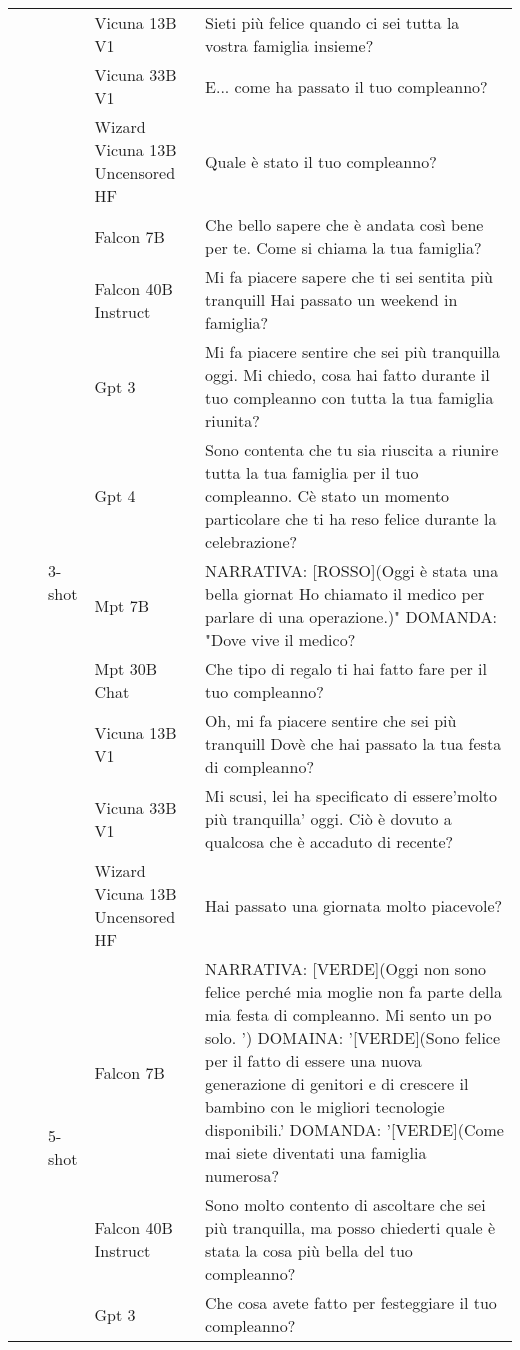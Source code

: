 \begin{center}
\begin{longtable}{l|l|l|p{3cm}|p{8cm}}
 &  &  & Vicuna 13B V1 & Sieti più felice quando ci sei tutta la vostra famiglia insieme? \\
 &  &  & Vicuna 33B V1 & E... come ha passato il tuo compleanno? \\
 &  &  & Wizard Vicuna 13B Uncensored HF &  Quale è stato il tuo compleanno? \\
\cline{3-5}
 &  & \multirow[c]{9}{*}{3-shot} & Falcon 7B & Che bello sapere che è andata così bene per te. Come si chiama la tua famiglia? \\
 &  &  & Falcon 40B Instruct & Mi fa piacere sapere che ti sei sentita più tranquill Hai passato un weekend in famiglia? \\
 &  &  & Gpt 3 & Mi fa piacere sentire che sei più tranquilla oggi. Mi chiedo, cosa hai fatto durante il tuo compleanno con tutta la tua famiglia riunita? \\
 &  &  & Gpt 4 & Sono contenta che tu sia riuscita a riunire tutta la tua famiglia per il tuo compleanno. Cè stato un momento particolare che ti ha reso felice durante la celebrazione? \\
 &  &  & Mpt 7B & NARRATIVA: [ROSSO](Oggi è stata una bella giornat Ho chiamato il medico per parlare di una operazione.)" DOMANDA: "Dove vive il medico? \\
 &  &  & Mpt 30B Chat & Che tipo di regalo ti hai fatto fare per il tuo compleanno? \\
 &  &  & Vicuna 13B V1 & Oh, mi fa piacere sentire che sei più tranquill Dovè che hai passato la tua festa di compleanno? \\
 &  &  & Vicuna 33B V1 &  Mi scusi, lei ha specificato di essere'molto più tranquilla' oggi. Ciò è dovuto a qualcosa che è accaduto di recente? \\
 &  &  & Wizard Vicuna 13B Uncensored HF & Hai passato una giornata molto piacevole? \\
\cline{3-5}
 &  & \multirow[c]{9}{*}{5-shot} & Falcon 7B & NARRATIVA: [VERDE](Oggi non sono felice perché mia moglie non fa parte della mia festa di compleanno. Mi sento un po solo. ') DOMAINA: '[VERDE](Sono felice per il fatto di essere una nuova generazione di genitori e di crescere il bambino con le migliori tecnologie disponibili.' DOMANDA: '[VERDE](Come mai siete diventati una famiglia numerosa? \\
 &  &  & Falcon 40B Instruct & Sono molto contento di ascoltare che sei più tranquilla, ma posso chiederti quale è stata la cosa più bella del tuo compleanno? \\
 &  &  & Gpt 3 & Che cosa avete fatto per festeggiare il tuo compleanno? \\

\end{longtable}
\end{center}
